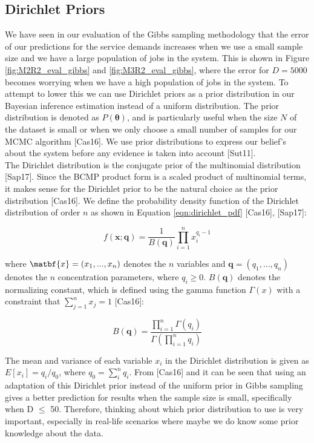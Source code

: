 \documentclass[a4paper,11pt,titlepage]{article}
\begin{document}
\subsection{Dirichlet Priors}

We have seen in our evaluation of the Gibbs sampling methodology that the error of our predictions for the service demands increases when we use a small sample size and we have a large population of jobs in the system. This is shown in Figure \ref{fig:M2R2_eval_gibbs} and \ref{fig:M3R2_eval_gibbs}, where the error for $D=5000$ becomes worrying when we have a high population of jobs in the system. To attempt to lower this we can use Dirichlet priors as a prior distribution in our Bayesian inference estimation instead of a uniform distribution. The prior distribution is denoted as $P(\bm{\theta})$, and is particularly useful when the size $N$ of the dataset is small or when we only choose a small number of samples for our MCMC algorithm [Cas16]. We use prior distributions to express our belief's about the system before any evidence is taken into account [Sut11].  \\

The Dirichlet distribution is the conjugate prior of the multinomial distribution [Sap17]. Since the BCMP product form is a scaled product of multinomial terms, it makes sense for the Dirichlet prior to be the natural choice as the prior distribution [Cas16]. We define the probability density function of the Dirichlet distribution of order $n$ as shown in Equation \ref{eqn:dirichlet_pdf} [Cas16], [Sap17]:

\begin{equation}
    f(\mathbf{x}; \mathbf{q}) = \frac{1}{B(\mathbf{q})} \prod_{i=1}^{n} x_{i}^{q_i-1}
    \label{eqn:dirichlet_pdf}
\end{equation}

where $\matbf{x} = (x_1,...,x_n)$ denotes the $n$ variables and $\mathbf{q} = (q_1,...,q_n)$ denotes the $n$ concentration parameters, where $q_i \geq 0$. $B(\mathbf{q})$ denotes the normalizing constant, which is defined using the gamma function $\Gamma(x)$ with a constraint that $\sum_{j=1}^n x_j = 1$ [Cas16]: 

\begin{equation}
    B(\mathbf{q}) = \frac{\prod_{i=1}^n \Gamma(q_i)}{\Gamma(\prod_{i=1}^n q_i)}
\end{equation}

The mean and variance of each variable $x_i$ in the Dirichlet distribution is given as $E[x_i] = q_i/q_0$, where $q_0 = \sum_{i}^{n} q_i$. From [Cas16] and it can be seen that using an adaptation of this Dirichlet prior instead of the uniform prior in Gibbs sampling gives a better prediction for results when the sample size is small, specifically when D $\leq$ 50. Therefore, thinking about which prior distribution to use is very important, especially in real-life scenarios where maybe we do know some prior knowledge about the data. 
\end{document}
